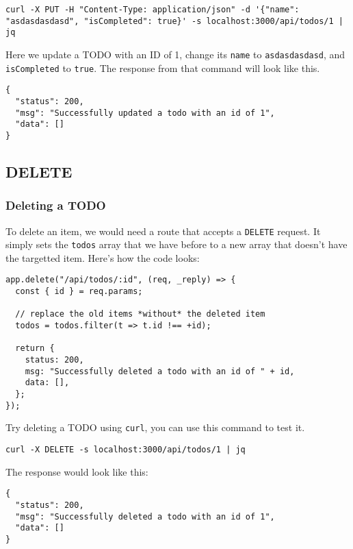 \documentclass[a4paper,14pt,titlepage]{article}
\def\c#1{\texttt{#1}}
\begin{document}
\begin{verbatim}
curl -X PUT -H "Content-Type: application/json" -d '{"name": "asdasdasdasd", "isCompleted": true}' -s localhost:3000/api/todos/1 | jq
\end{verbatim}

Here we update a TODO with an ID of 1, change its \c{name} to \c{asdasdasdasd},
and \c{isCompleted} to \c{true}. The response from that command will look like
this.

\begin{verbatim}
{
  "status": 200,
  "msg": "Successfully updated a todo with an id of 1",
  "data": []
}
\end{verbatim}

\newpage

\subsection{DELETE}
\subsubsection{Deleting a TODO}

To delete an item, we would need a route that accepts a \c{DELETE} request. It
simply sets the \c{todos} array that we have before to a new array that doesn't
have the targetted item. Here's how the code looks:

\begin{verbatim}
app.delete("/api/todos/:id", (req, _reply) => {
  const { id } = req.params;

  // replace the old items *without* the deleted item
  todos = todos.filter(t => t.id !== +id);

  return {
    status: 200,
    msg: "Successfully deleted a todo with an id of " + id,
    data: [],
  };
});
\end{verbatim}

Try deleting a TODO using \c{curl}, you can use this command to test it.

\begin{verbatim}
curl -X DELETE -s localhost:3000/api/todos/1 | jq
\end{verbatim}

The response would look like this:

\begin{verbatim}
{
  "status": 200,
  "msg": "Successfully deleted a todo with an id of 1",
  "data": []
}
\end{verbatim}
\end{document}
